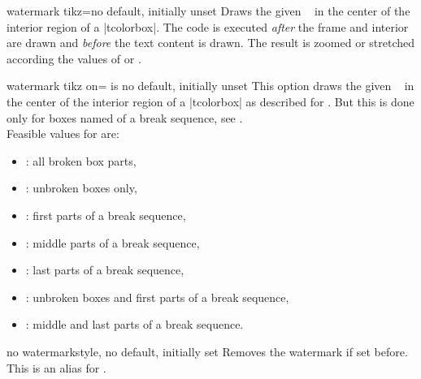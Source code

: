 \clearpage
\begin{docTcbKey}{watermark tikz}{=}{no default, initially unset}
  Draws the given \tikzname\ 
  in the center of the interior region of a |tcolorbox|.
  The code is executed \emph{after} the
  frame and interior are drawn and \emph{before} the text content is drawn.
  The result is zoomed or stretched according the values of
   or .
\begin{dispExample}

\begin{tcolorbox}[enhanced,title=My title,
  watermark tikz={\draw[line width=2mm] circle (1cm)
    node{\fontfamily{ptm}\fontseries{b}\fontsize{20mm}{20mm}\selectfont ?};}]
\lipsum[1]
\tcblower
\lipsum[2]
\end{tcolorbox}
\end{dispExample}
\end{docTcbKey}



\begin{docTcbKey}{watermark tikz on}{= is }{no default, initially unset}
  This option draws the given \tikzname\  in the center of the interior region of a |tcolorbox|
  as described for .
  But this is done only for boxes named  of a break sequence, see
  .\\ 
  Feasible values for  are:
  \begin{itemize}
  \item{}: all broken box parts,
  \item{}: unbroken boxes only,
  \item{}: first parts of a break sequence,
  \item{}: middle parts of a break sequence,
  \item{}: last parts of a break sequence,
  \item{}: unbroken boxes and first parts of a break sequence,
  \item{}: middle and last parts of a break sequence.
  \end{itemize}
\end{docTcbKey}


\begin{docTcbKey}{no watermark}{}{style, no default, initially set}
  Removes the watermark if set before. This is an alias for
  .
\end{docTcbKey}


